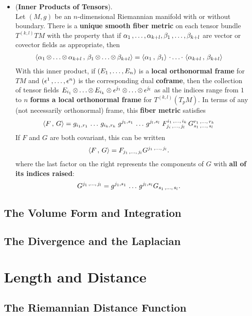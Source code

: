 \documentclass[11pt]{article}
\begin{document}
\begin{itemize}
\item \begin{proposition} (\textbf{Inner Products of Tensors}). \citep{lee2018introduction} \\
Let $(M,g)$ be an $n$-dimensional Riemannian manifold with or without boundary. There is a \textbf{unique smooth fiber metric} on each tensor bundle $T^{(k,l)}TM$ with the property that if $\alpha_1 \,{,}\ldots{,}\, \alpha_{k+l}, \beta_1 \,{,}\ldots{,}\, \beta_{k+l}$ are vector or covector fields as appropriate, then
\begin{align}
\left\langle \alpha_1 \,{\otimes}\ldots{\otimes}\, \alpha_{k+l}\,,\, \beta_1 \,{\otimes}\ldots{\otimes}\, \beta_{k+l} \right\rangle &= \left\langle \alpha_1\,,\, \beta_1 \right\rangle \,{\cdot}\ldots{\cdot}\, \left\langle \alpha_{k+l}\,,\, \beta_{k+l} \right\rangle \label{eqn: inner_product_tensor}
\end{align} With this inner product, if $(E_1 \,{,}\ldots{,}\, E_n)$ is a \textbf{local orthonormal frame} for $TM$ and $(\epsilon^1 \,{,}\ldots{,}\, \epsilon^n)$ is the corresponding dual \textbf{coframe}, then the collection of tensor fields $E_{i_1} \,{\otimes}\ldots{\otimes}\, E_{i_k} \otimes \epsilon^{j_1} \,{\otimes}\ldots{\otimes}\, \epsilon^{j_l}$ as all the indices range from $1$ to $n$ \textbf{forms a local orthonormal frame} for $T^{(k,l)}(T_pM)$. In terms of any (not necessarily orthonormal) frame, this \textbf{fiber metric} satisfies
\begin{align}
\left\langle F\,,\, G \right\rangle &= g_{i_1, r_1} \,{}\ldots{}\, g_{i_k, r_k}\; g^{j_1, s_1} \,{}\ldots{}\, g^{j_l, s_l}\; F_{j_i \,{,}\ldots{,}\, j_l}^{i_1 \,{,}\ldots{,}\, i_k}\,G_{s_1 \,{,}\ldots{,}\, s_l}^{r_1 \,{,}\ldots{,}\, r_k} \label{eqn: inner_product_tensor_represent}
\end{align} If $F$ and $G$ are both covariant, this can be written
\begin{align*}
\left\langle F\,,\, G \right\rangle &= F_{j_1 \,{,}\ldots{,}\, j_l} G^{j_1\,{,}\ldots{,}\, j_l}.
\end{align*} where the last factor on the right represents the components of $G$ with \textbf{all of its indices raised}:
\begin{align*}
G^{j_1\,{,}\ldots{,}\, j_l} &= g^{j_1, s_1} \,{}\ldots{}\, g^{j_l, s_l} G_{s_1 \,{,}\ldots{,}\, s_l}.
\end{align*}
\end{proposition}
\end{itemize}

\subsection{The Volume Form and Integration}

\subsection{The Divergence and the Laplacian}

\section{Length and Distance}
\subsection{The Riemannian Distance Function}



\newpage


\end{document}
